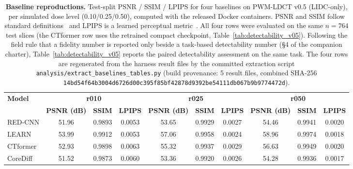 \documentclass[twoside,11pt]{article}
\begin{document}
\begin{table}[ht]
    \centering
    \small
    \setlength{\tabcolsep}{4pt}
    \begin{tabular}{lccccccccc}
        \toprule
        \multirow{2}{*}{\textbf{Model}} & \multicolumn{3}{c}{\textbf{r010}} & \multicolumn{3}{c}{\textbf{r025}} & \multicolumn{3}{c}{\textbf{r050}} \\
        \cmidrule(lr){2-4} \cmidrule(lr){5-7} \cmidrule(lr){8-10}
        & \textbf{PSNR (dB)} & \textbf{SSIM} & \textbf{LPIPS} & \textbf{PSNR (dB)} & \textbf{SSIM} & \textbf{LPIPS} & \textbf{PSNR (dB)} & \textbf{SSIM} & \textbf{LPIPS} \\
        \midrule
        RED-CNN   & 51.96 & 0.9893 & 0.0053 & 53.65 & 0.9929 & 0.0027 & 54.46 & 0.9941 & 0.0020 \\
        LEARN     & 53.99 & 0.9912 & 0.0053 & 57.06 & 0.9958 & 0.0024 & 58.96 & 0.9974 & 0.0018 \\
        CTformer  & 52.93 & 0.9898 & 0.0063 & 55.32 & 0.9937 & 0.0029 & 56.63 & 0.9949 & 0.0020 \\
        CoreDiff  & 51.52 & 0.9873 & 0.0060 & 53.36 & 0.9920 & 0.0026 & 54.28 & 0.9936 & 0.0017 \\
        \bottomrule
    \end{tabular}
    \caption{\textbf{Baseline reproductions.} Test-split PSNR / SSIM / LPIPS for four baselines on PWM-LDCT v0.5 (LIDC-only), per simulated dose level (0.10/0.25/0.50), computed with the released Docker containers. PSNR and SSIM follow standard definitions~\citep{wang2004image} and LPIPS is a learned perceptual metric~\citep{zhang2018unreasonable}. All four rows were evaluated on the same $n = 764$ test slices (the CTformer row uses the retrained compact checkpoint, Table~\ref{tab:detectability_v05}). Following the field rule that a fidelity number is reported only beside a task-based detectability number (\S 4 of the companion charter), Table~\ref{tab:detectability_v05} reports the paired detectability assessment on the same task. The four rows are regenerated from the harness result files by the committed extraction script \texttt{analysis/extract\_baselines\_tables.py} (build provenance: 5 result files, combined SHA-256 \texttt{14bd54f64b3004d6726d00c395f85bf42878d9392be54111db067b9b9774472d}).}
    \label{tab:baselines_v05}
\end{table}
\end{document}
